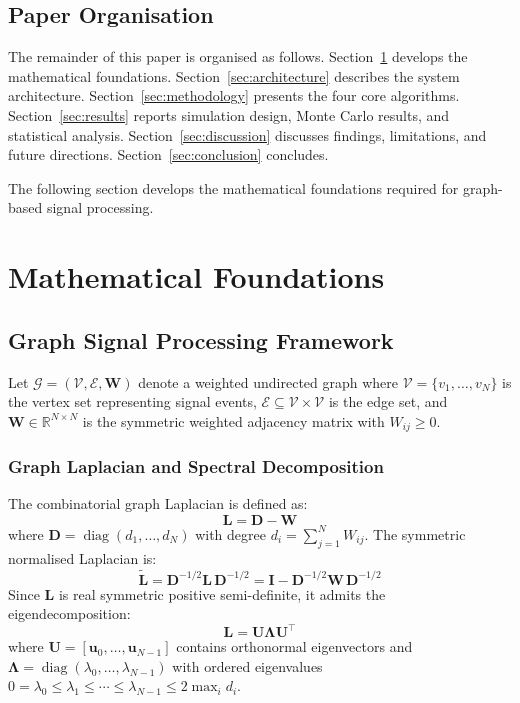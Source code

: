 \documentclass[sensors,article,submit,pdftex]{mdpi}
\newcommand{\vect}[1]{\boldsymbol{#1}}
\newcommand{\mat}[1]{\mathbf{#1}}
\newcommand{\R}{\mathbb{R}}
\DeclareMathOperator{\diag}{diag}
\begin{document}
\subsection{Paper Organisation}
The remainder of this paper is organised as follows. Section~\ref{sec:math} develops the mathematical foundations. Section~\ref{sec:architecture} describes the system architecture. Section~\ref{sec:methodology} presents the four core algorithms. Section~\ref{sec:results} reports simulation design, Monte Carlo results, and statistical analysis. Section~\ref{sec:discussion} discusses findings, limitations, and future directions. Section~\ref{sec:conclusion} concludes.

The following section develops the mathematical foundations required for graph-based signal processing.

\section{Mathematical Foundations}
\label{sec:math}

\subsection{Graph Signal Processing Framework}
Let $\mathcal{G} = (\mathcal{V}, \mathcal{E}, \mat{W})$ denote a weighted undirected graph where $\mathcal{V} = \{v_1, \ldots, v_N\}$ is the vertex set representing signal events, $\mathcal{E} \subseteq \mathcal{V} \times \mathcal{V}$ is the edge set, and $\mat{W} \in \R^{N \times N}$ is the symmetric weighted adjacency matrix with $W_{ij} \geq 0$.

\subsubsection{Graph Laplacian and Spectral Decomposition}
The combinatorial graph Laplacian is defined as:
\begin{equation}
    \mat{L} = \mat{D} - \mat{W}
    \label{eq:laplacian}
\end{equation}
where $\mat{D} = \diag(d_1, \ldots, d_N)$ with degree $d_i = \sum_{j=1}^{N} W_{ij}$. The symmetric normalised Laplacian is:
\begin{equation}
    \tilde{\mat{L}} = \mat{D}^{-1/2} \mat{L}\, \mat{D}^{-1/2} = \mat{I} - \mat{D}^{-1/2} \mat{W}\, \mat{D}^{-1/2}
    \label{eq:norm_laplacian}
\end{equation}
Since $\mat{L}$ is real symmetric positive semi-definite, it admits the eigendecomposition:
\begin{equation}
    \mat{L} = \mat{U} \mat{\Lambda} \mat{U}^\top
    \label{eq:eigendecomp}
\end{equation}
where $\mat{U} = [\vect{u}_0, \ldots, \vect{u}_{N-1}]$ contains orthonormal eigenvectors and $\mat{\Lambda} = \diag(\lambda_0, \ldots, \lambda_{N-1})$ with ordered eigenvalues $0 = \lambda_0 \leq \lambda_1 \leq \cdots \leq \lambda_{N-1} \leq 2\max_i d_i$.
\end{document}

